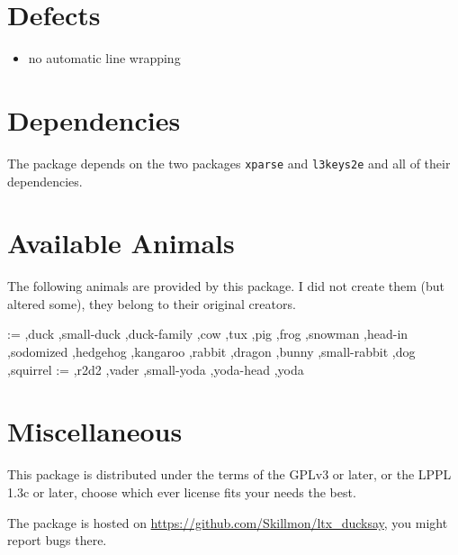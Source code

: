 \documentclass[a4paper,10pt]{article}
\makeatletter
\newcommand*{\availableAnimal}[1]{\@for\cs:=#1\do{%
  \ifx\cs\@empty\else%
    \rlap{\expandafter\ducksay\expandafter[\cs]{\cs}}\hfill\mbox{}\\[1ex]%
  \fi%
}}
\makeatother
\begin{document}
\section{Defects}%
{\reversemarginpar{}}
\begin{itemize}
  \item no automatic line wrapping
\end{itemize}
\section{Dependencies}%
The package depends on the two packages \texttt{xparse} and \texttt{l3keys2e}
and all of their dependencies.
\section{Available Animals}\label{sec:animals}%
The following animals are provided by this package. I did not create them (but
altered some), they belong to their original creators.
\footnotesize
\begin{multicols}{2}
\availableAnimal{%
  ,duck%
  ,small-duck%
  ,duck-family%
  ,cow%
  ,tux%
  ,pig%
  ,frog%
  ,snowman%
  ,head-in%
  ,sodomized%
  ,hedgehog%
  ,kangaroo%
  ,rabbit%
  ,dragon%
  ,bunny%
  ,small-rabbit%
  ,dog%
  ,squirrel%
}\clearpage\availableAnimal{%
  ,r2d2%
  ,vader%
  ,small-yoda%
  ,yoda-head%
  ,yoda%
}%
\end{multicols}
\section{Miscellaneous}%
This package is distributed under the terms of the GPLv3 or later, or the LPPL
1.3c or later, choose which ever license fits your needs the best.

The package is hosted on \url{https://github.com/Skillmon/ltx_ducksay}, you
might report bugs there.
\clearpage
\thispagestyle{empty}
\bgroup
\Huge
\mbox{}\vfill
\centering
{}
\vfill
\hfill{}
\egroup
{}
\end{document}
